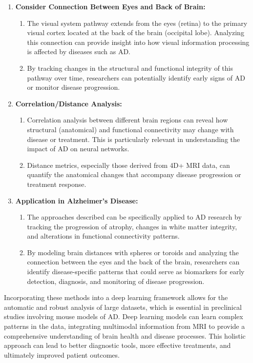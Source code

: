 \documentclass[twocolumn]{article}
\begin{document}
\begin{enumerate}
\item \textbf{Consider Connection Between Eyes and Back of Brain:}
  \begin{enumerate}
  \item The visual system pathway extends from the eyes (retina) to the primary visual cortex located at the back of the brain (occipital lobe).
Analyzing this connection can provide insight into how visual information processing is affected by diseases such as AD.
  \item By tracking changes in the structural and functional integrity of this pathway over time, researchers can potentially identify early signs of AD
or monitor disease progression.
  \end{enumerate}

\item \textbf{Correlation/Distance Analysis:}
  \begin{enumerate}
  \item Correlation analysis between different brain regions can reveal how structural (anatomical) and functional connectivity may change with disease
or treatment. This is particularly relevant in understanding the impact of AD on neural networks.
  \item Distance metrics, especially those derived from 4D+ MRI data, can quantify the anatomical changes that accompany disease progression or treatment
response.
  \end{enumerate}

\item \textbf{Application in Alzheimer's Disease:}
  \begin{enumerate}
  \item The approaches described can be specifically applied to AD research by tracking the progression of atrophy, changes in white matter integrity,
and alterations in functional connectivity patterns.
  \item By modeling brain distances with spheres or toroids and analyzing the connection between the eyes and the back of the brain, researchers can
identify disease-specific patterns that could serve as biomarkers for early detection, diagnosis, and monitoring of disease progression.
  \end{enumerate}

\end{enumerate}

Incorporating these methods into a deep learning framework allows for the automatic and robust analysis of large datasets, which is essential in preclinical studies involving mouse models of AD. Deep learning models can learn complex patterns in the data, integrating multimodal information from MRI to provide a comprehensive understanding of brain health and disease processes. This holistic approach can lead to better diagnostic tools, more effective treatments, and ultimately improved patient outcomes.
\end{document}
